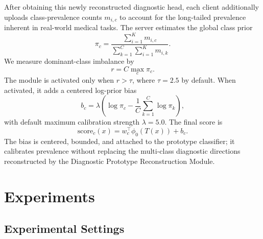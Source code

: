 \documentclass[letterpaper]{article} %
\begin{document}
After obtaining this newly reconstructed diagnostic head, each client additionally uploads class-prevalence counts $m_{i,c}$ to account for the long-tailed prevalence inherent in real-world medical tasks. The server estimates the global class prior
\begin{equation}
\pi_c=\frac{\sum_{i=1}^{K}m_{i,c}}{\sum_{k=1}^{C}\sum_{i=1}^{K}m_{i,k}}.
\end{equation}
We measure dominant-class imbalance by
\begin{equation}
r=C\max_c \pi_c.
\end{equation}
The module is activated only when $r>\tau$, where $\tau=2.5$ by default. When activated, it adds a centered log-prior bias
\begin{equation}
b_c=\lambda\left(\log\pi_c-\frac{1}{C}\sum_{k=1}^{C}\log\pi_k\right),
\end{equation}
with default maximum calibration strength $\lambda=5.0$. The final score is
\begin{equation}
\mathrm{score}_c(x)=w_c^\top\phi_0(T(x))+b_c.
\end{equation}
The bias is centered, bounded, and attached to the prototype classifier; it calibrates prevalence without replacing the multi-class diagnostic directions reconstructed by the Diagnostic Prototype Reconstruction Module.

\section{Experiments}

\subsection{Experimental Settings}
\end{document}

